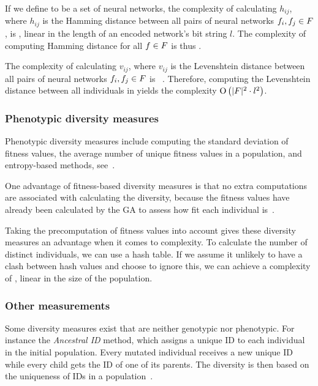 If we define \indset{} to be a set of neural networks, the complexity of calculating $h_{ij}$, where $h_{ij}$ is the Hamming distance between all pairs of neural networks $f_i, f_j \in F$, is \bigO{\bitstringl}, linear in the length of an encoded network's bit string $l$. The complexity of computing Hamming distance for all $f \in F$ is thus \bigO{\indsetl^2 \cdot \bitstringl}. 

The complexity of calculating $v_{ij}$, where $v_{ij}$ is the Levenshtein distance between all pairs of neural networks $f_i, f_j \in F$ is ~\cite{Freeman:2006:CLN:1220835.1220895}. Therefore, computing the Levenshtein distance between all individuals in \indset{} yields the complexity $\operatorname{O}\left(\lvert F\rvert^2 \cdot l^2\right)$.

\subsubsection{Phenotypic diversity measures}
Phenotypic diversity measures include computing the standard deviation of fitness values, the average number of unique fitness values in a population, and entropy-based methods, see~\cite{1250187, 1266373}.

One advantage of fitness-based diversity measures is that no extra computations are associated with calculating the diversity, because the fitness values have already been calculated by the GA to assess how fit each individual is~\cite{Nguyen:2006:ASPGP}.

Taking the precomputation of fitness values into account gives these diversity measures an advantage when it comes to complexity. To calculate the number of distinct individuals, we can use a hash table. If we assume it unlikely to have a clash between hash values and choose to ignore this, we can achieve a complexity of \bigO{\indsetl}, linear in the size of the population.

\subsubsection{Other measurements}
Some diversity measures exist that are neither genotypic nor phenotypic. For instance the \emph{Ancestral ID} method, which assigns a unique ID to each individual in the initial population. Every mutated individual receives a new unique ID while every child gets the ID of one of its parents. The diversity is then based on the uniqueness of IDs in a population~\cite{1250187}.
